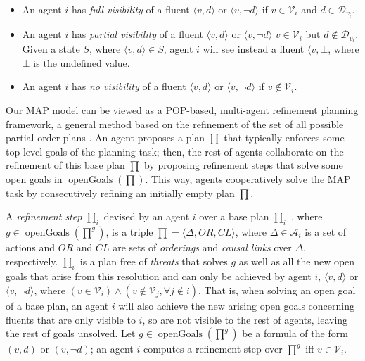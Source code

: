 \documentclass[12pt]{article}
\DeclareMathOperator{\openGoals}{openGoals}
\begin{document}
\begin{itemize}
  \item An agent $i$ has \textit{full visibility} of a fluent $\langle v,d\rangle$ or $\langle v,\neg d\rangle$ if $v \in \mathcal{V}_i$ and $d \in \mathcal{D}_{v_i}$.
  \item An agent $i$ has \textit{partial visibility} of a fluent $\langle v,d\rangle$ or $\langle v,\neg d\rangle$ $v \in \mathcal{V}_i$ but $d \notin \mathcal{D}_{v_i}$. Given a state $S$, where $\langle v,d\rangle \in S$, agent $i$ will see instead a fluent $\langle v, \bot$, where $\bot$ is the undefined value.
  \item An agent $i$ has \textit{no visibility} of a fluent $\langle v,d\rangle$ or $\langle v,\neg d\rangle$ if $v \notin \mathcal{V}_i$.
\end{itemize}

Our MAP model can be viewed as a POP-based, multi-agent refinement planning framework, a general method based on the refinement of the set of all possible partial-order plans \cite{Kambhampati_1997}. An agent proposes a plan $\prod$ that typically enforces some top-level goals of the planning task; then, the rest of agents collaborate on the refinement of this base plan $\prod$ by proposing refinement steps that solve some open goals in $\openGoals(\prod)$. This way, agents cooperatively solve the MAP task by consecutively refining an initially empty plan $\prod$.

A \textit{refinement step} $\prod_i$ devised by an agent $i$ over a base plan $\prod_i$ , where $g \in \openGoals(\prod^g)$, is a triple $\prod = \langle \Delta, OR, CL\rangle$, where $\Delta \in \mathcal{A}_i$ is a set of actions and $OR$ and $CL$ are sets of \textit{orderings} and \textit{causal links} over $\Delta$, respectively. $\prod_i$ is a plan free of \textit{threats} \cite{Younes2003VHPOPVH} that solves $g$ as well as all the new open goals that arise from this resolution and can only be achieved by agent $i$, $\langle v, d\rangle$ or $\langle v, \neg d\rangle$, where $(v \in \mathcal{V}_i) \wedge (v \notin \mathcal{V}_j, \forall j \notin i)$. That is, when solving an open goal of a base plan, an agent $i$ will also achieve the new arising open goals concerning fluents that are only visible to $i$, so are not visible to the rest of agents, leaving the rest of goals unsolved. Let $g \in \openGoals(\prod^g)$ be a formula of the form $(v, d)$ or $(v, ¬d)$; an agent $i$ computes a refinement step over $\prod^g$ iff $v \in \mathcal{V}_i$.
\end{document}
